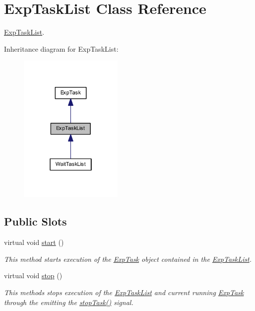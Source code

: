 \hypertarget{class_exp_task_list}{}\section{Exp\+Task\+List Class Reference}
\label{class_exp_task_list}


\hyperlink{class_exp_task_list}{Exp\+Task\+List}.  




Inheritance diagram for Exp\+Task\+List\+:\nopagebreak
\begin{figure}[H]
\begin{center}
\leavevmode
\includegraphics[width=142pt]{class_exp_task_list__inherit__graph}
\end{center}
\end{figure}
\subsection*{Public Slots}
\begin{DoxyCompactItemize}
\item 
virtual void \hyperlink{class_exp_task_list_aac7d8753382c988d39d2a3054ed2c7aa}{start} ()
\begin{DoxyCompactList}\small\item\em This method starts execution of the \hyperlink{class_exp_task}{Exp\+Task} object contained in the \hyperlink{class_exp_task_list}{Exp\+Task\+List}. \end{DoxyCompactList}\item 
virtual void \hyperlink{class_exp_task_list_ae3542825c792c23c1f2a54b9d63074d1}{stop} ()
\begin{DoxyCompactList}\small\item\em This methods stops execution of the \hyperlink{class_exp_task_list}{Exp\+Task\+List} and current running \hyperlink{class_exp_task}{Exp\+Task} through the emitting the \hyperlink{class_exp_task_list_a445b0e774f24ebcd351ef5121d7f9487}{stop\+Task()} signal. \end{DoxyCompactList}\end{DoxyCompactItemize}

